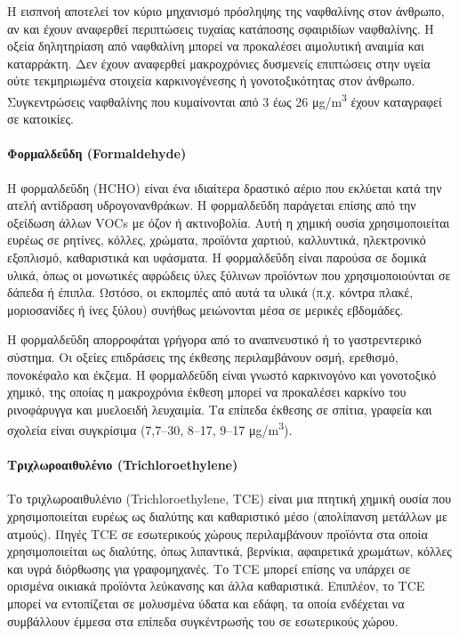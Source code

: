 Η εισπνοή αποτελεί τον κύριο μηχανισμό πρόσληψης της ναφθαλίνης στον άνθρωπο, αν και έχουν αναφερθεί περιπτώσεις τυχαίας κατάποσης σφαιριδίων ναφθαλίνης. Η οξεία δηλητηρίαση από ναφθαλίνη μπορεί να προκαλέσει αιμολυτική αναιμία και καταρράκτη. 
Δεν έχουν αναφερθεί μακροχρόνιες δυσμενείς επιπτώσεις στην υγεία ούτε τεκμηριωμένα στοιχεία καρκινογένεσης ή γονοτοξικότητας στον άνθρωπο.
Συγκεντρώσεις ναφθαλίνης που κυμαίνονται από 3 έως 26 μg/m\textsuperscript{3} έχουν καταγραφεί σε κατοικίες.


\paragraph{Φορμαλδεΰδη (Formaldehyde)}

Η φορμαλδεΰδη (HCHO) είναι ένα ιδιαίτερα δραστικό αέριο που εκλύεται κατά την ατελή αντίδραση υδρογονανθράκων.
 Η φορμαλδεΰδη παράγεται επίσης από την οξείδωση άλλων VOCs με όζον ή ακτινοβολία. Αυτή η χημική ουσία χρησιμοποιείται ευρέως σε ρητίνες, κόλλες, χρώματα, προϊόντα χαρτιού, καλλυντικά, ηλεκτρονικό εξοπλισμό, καθαριστικά και υφάσματα. 
 Η φορμαλδεΰδη είναι παρούσα σε δομικά υλικά, όπως οι μονωτικές αφρώδεις ύλες ξύλινων προϊόντων που χρησιμοποιούνται σε δάπεδα ή έπιπλα. Ωστόσο, οι εκπομπές από αυτά τα υλικά (π.χ. κόντρα πλακέ, μοριοσανίδες ή ίνες ξύλου) συνήθως μειώνονται μέσα σε μερικές εβδομάδες.

Η φορμαλδεΰδη απορροφάται γρήγορα από το αναπνευστικό ή το γαστρεντερικό σύστημα. Οι οξείες επιδράσεις της έκθεσης περιλαμβάνουν οσμή, ερεθισμό, πονοκέφαλο και έκζεμα. 
Η φορμαλδεΰδη είναι γνωστό καρκινογόνο και γονοτοξικό χημικό, της οποίας η μακροχρόνια έκθεση μπορεί να προκαλέσει καρκίνο του ρινοφάρυγγα και μυελοειδή λευχαιμία.
Τα επίπεδα έκθεσης σε σπίτια, γραφεία και σχολεία είναι συγκρίσιμα (7,7–30, 8–17, 9–17 μg/m\textsuperscript{3}).


\paragraph{Τριχλωροαιθυλένιο (Trichloroethylene)}

Το τριχλωροαιθυλένιο (Trichloroethylene, TCE) είναι μια πτητική χημική ουσία που χρησιμοποιείται ευρέως ως διαλύτης και καθαριστικό μέσο (απολίπανση μετάλλων με ατμούς). 
Πηγές TCE σε εσωτερικούς χώρους περιλαμβάνουν προϊόντα στα οποία χρησιμοποιείται ως διαλύτης, όπως λιπαντικά, βερνίκια, αφαιρετικά χρωμάτων, κόλλες και υγρά διόρθωσης για γραφομηχανές.
 Το TCE μπορεί επίσης να υπάρχει σε ορισμένα οικιακά προϊόντα λεύκανσης και άλλα καθαριστικά. Επιπλέον, το TCE μπορεί να εντοπίζεται σε μολυσμένα ύδατα και εδάφη, τα οποία ενδέχεται να συμβάλλουν έμμεσα στα επίπεδα συγκέντρωσής του σε εσωτερικούς χώρου.

